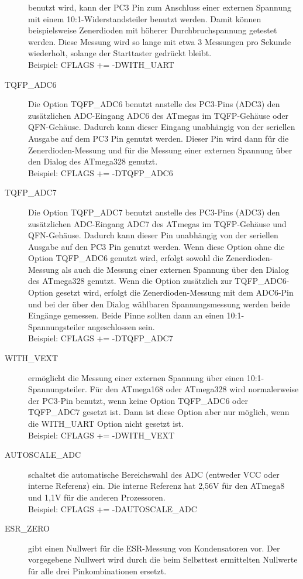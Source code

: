 \begin{description}
benutzt wird, kann der PC3 Pin zum Anschluss einer externen Spannung mit einem 10:1-Widerstandsteiler benutzt
werden. Damit können beispielsweise Zenerdioden mit höherer Durchbruchspannung getestet werden.
Diese Messung wird so lange mit etwa 3 Messungen pro Sekunde wiederholt, solange der Starttaster gedrückt bleibt.\\
Beispiel: CFLAGS += -DWITH\_UART
  \item[TQFP\_ADC6] Die Option TQFP\_ADC6 benutzt anstelle des PC3-Pins (ADC3) den zusätzlichen ADC-Eingang ADC6
des ATmegas im TQFP-Gehäuse oder QFN-Gehäuse.
Dadurch kann dieser Eingang unabhängig von der seriellen Ausgabe auf dem PC3 Pin genutzt werden. Dieser Pin wird
dann für die Zenerdioden-Messung und für die Messung einer externen Spannung über den Dialog des ATmega328 genutzt.\\
Beispiel: CFLAGS += -DTQFP\_ADC6
  \item[TQFP\_ADC7] Die Option TQFP\_ADC7 benutzt anstelle des PC3-Pins (ADC3) den zusätzlichen ADC-Eingang ADC7
des ATmegas im TQFP-Gehäuse und QFN-Gehäuse.
Dadurch kann dieser Pin unabhängig von der seriellen Ausgabe auf den PC3 Pin genutzt werden. Wenn diese Option 
ohne die Option TQFP\_ADC6 genutzt wird, erfolgt sowohl die Zenerdioden-Messung als auch die Messung einer externen
Spannung über den Dialog des ATmega328 genutzt. Wenn die Option zusätzlich zur TQFP\_ADC6-Option gesetzt wird,
erfolgt die Zenerdioden-Messung mit dem ADC6-Pin und bei der über den Dialog wählbaren Spannungsmessung werden
beide Eingänge gemessen. Beide Pinne sollten dann an einen 10:1-Spannungsteiler angeschlossen sein.\\
Beispiel: CFLAGS += -DTQFP\_ADC7
  \item[WITH\_VEXT] ermöglicht die Messung einer externen Spannung über einen 10:1-Spannungsteiler.
Für den ATmega168 oder ATmega328 wird normalerweise der PC3-Pin benutzt, wenn keine Option TQFP\_ADC6 oder
TQFP\_ADC7 gesetzt ist. Dann ist diese Option aber nur möglich, wenn die WITH\_UART Option nicht gesetzt ist.\\
Beispiel: CFLAGS += -DWITH\_VEXT 
  \item[AUTOSCALE\_ADC] schaltet die automatische Bereichswahl des ADC (entweder VCC oder interne Referenz) ein.
Die interne Referenz hat 2,56V für den ATmega8 und 1,1V für die anderen Prozessoren.\\
Beispiel: CFLAGS += -DAUTOSCALE\_ADC
  \item[ESR\_ZERO] gibt einen Nullwert für die ESR-Messung von Kondensatoren vor.
Der vorgegebene Nullwert wird durch die beim Selbsttest ermittelten Nullwerte für alle drei Pinkombinationen ersetzt.

\end{description}
